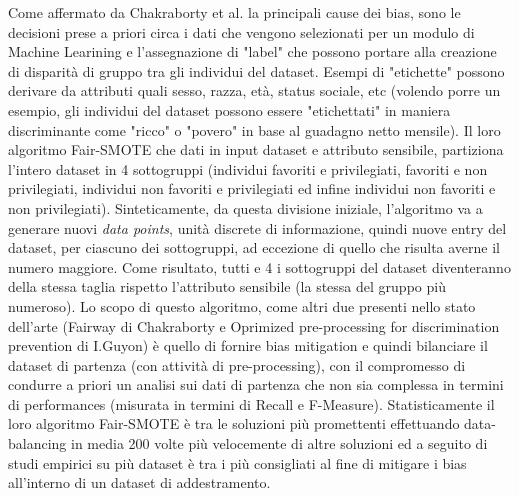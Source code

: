 Come affermato da Chakraborty et al.\cite{biasInML}  la principali cause dei bias, sono le decisioni prese a priori circa i dati che vengono selezionati per un modulo di Machine Learining e l'assegnazione di "label" che possono portare alla creazione di disparità di gruppo tra gli individui del dataset. Esempi di "etichette" possono derivare da attributi quali sesso, razza, età, status sociale, etc (volendo porre un esempio, gli individui del dataset possono essere "etichettati" in maniera discriminante come "ricco" o "povero" in base al guadagno netto mensile). Il loro algoritmo Fair-SMOTE che dati in input dataset e attributo sensibile, partiziona l'intero dataset in 4 sottogruppi (individui favoriti e privilegiati, favoriti e non privilegiati, individui non favoriti e privilegiati ed infine individui non favoriti e non privilegiati). Sinteticamente, da questa divisione iniziale, l'algoritmo va a generare nuovi \emph{data points}, unità discrete di informazione, quindi nuove entry del dataset, per ciascuno dei sottogruppi, ad eccezione di quello che risulta averne il numero maggiore. Come risultato, tutti e 4 i sottogruppi del dataset diventeranno della stessa taglia rispetto l'attributo sensibile (la stessa del gruppo più numeroso). Lo scopo di questo algoritmo, come altri due presenti nello stato dell'arte (Fairway di Chakraborty e Oprimized pre-processing for discrimination prevention di I.Guyon) è quello di fornire bias mitigation e quindi bilanciare il dataset di partenza (con attività di pre-processing), con il compromesso di condurre a priori un analisi sui dati di partenza che non sia complessa in termini di performances (misurata in termini di Recall e F-Measure). Statisticamente il loro algoritmo Fair-SMOTE è tra le soluzioni più promettenti effettuando data-balancing in media 200 volte più velocemente di altre soluzioni ed a seguito di studi empirici su più dataset è tra i più consigliati al fine di mitigare i bias all'interno di un dataset di addestramento.

